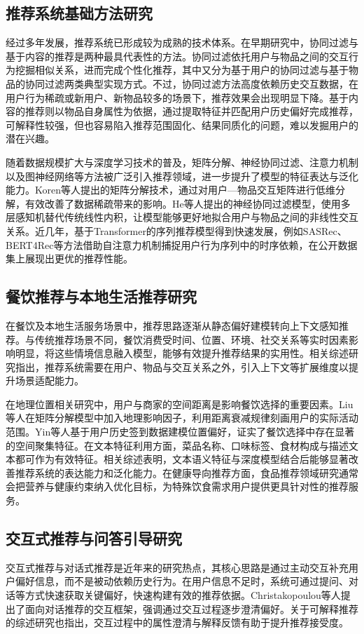 \subsection{推荐系统基础方法研究}
经过多年发展，推荐系统已形成较为成熟的技术体系。在早期研究中，协同过滤与基于内容的推荐是两种最具代表性的方法。协同过滤依托用户与物品之间的交互行为挖掘相似关系，进而完成个性化推荐，其中又分为基于用户的协同过滤与基于物品的协同过滤两类典型实现方式\super{[3]}。不过，协同过滤方法高度依赖历史交互数据，在用户行为稀疏或新用户、新物品较多的场景下，推荐效果会出现明显下降。基于内容的推荐则以物品自身属性为依据，通过提取特征并匹配用户历史偏好完成推荐，可解释性较强，但也容易陷入推荐范围固化、结果同质化的问题，难以发掘用户的潜在兴趣\super{[4]}。

随着数据规模扩大与深度学习技术的普及，矩阵分解、神经协同过滤、注意力机制以及图神经网络等方法被广泛引入推荐领域，进一步提升了模型的特征表达与泛化能力。Koren等人提出的矩阵分解技术，通过对用户—物品交互矩阵进行低维分解，有效改善了数据稀疏带来的影响\super{[5]}。He等人提出的神经协同过滤模型，使用多层感知机替代传统线性内积，让模型能够更好地拟合用户与物品之间的非线性交互关系\super{[6]}。近几年，基于Transformer的序列推荐模型得到快速发展，例如SASRec、BERT4Rec等方法借助自注意力机制捕捉用户行为序列中的时序依赖，在公开数据集上展现出更优的推荐性能\super{[7]}。

\subsection{餐饮推荐与本地生活推荐研究}
在餐饮及本地生活服务场景中，推荐思路逐渐从静态偏好建模转向上下文感知推荐。与传统推荐场景不同，餐饮消费受时间、位置、环境、社交关系等实时因素影响明显，将这些情境信息融入模型，能够有效提升推荐结果的实用性。相关综述研究指出，推荐系统需要在用户、物品与交互关系之外，引入上下文等扩展维度以提升场景适配能力\super{[8]}。

在地理位置相关研究中，用户与商家的空间距离是影响餐饮选择的重要因素。Liu等人在矩阵分解模型中加入地理影响因子，利用距离衰减规律刻画用户的实际活动范围\super{[9]}。Yin等人基于用户历史签到数据建模位置偏好，证实了餐饮选择中存在显著的空间聚集特征\super{[10]}。在文本特征利用方面，菜品名称、口味标签、食材构成与描述文本都可作为有效特征。相关综述表明，文本语义特征与深度模型结合后能够显著改善推荐系统的表达能力和泛化能力\super{[11]}。在健康导向推荐方面，食品推荐领域研究通常会把营养与健康约束纳入优化目标，为特殊饮食需求用户提供更具针对性的推荐服务\super{[12]}。

\subsection{交互式推荐与问答引导研究}
交互式推荐与对话式推荐是近年来的研究热点，其核心思路是通过主动交互补充用户偏好信息，而不是被动依赖历史行为。在用户信息不足时，系统可通过提问、对话等方式快速获取关键偏好，快速构建有效的推荐依据。Christakopoulou等人提出了面向对话推荐的交互框架，强调通过交互过程逐步澄清偏好\super{[13]}。关于可解释推荐的综述研究也指出，交互过程中的属性澄清与解释反馈有助于提升推荐接受度\super{[14]}。

